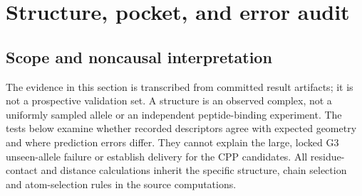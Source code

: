 \clearpage
\section{Structure, pocket, and error audit}
\subsection{Scope and noncausal interpretation}
The evidence in this section is transcribed from committed result artifacts; it is not a prospective validation set. A structure is an observed complex, not a uniformly sampled allele or an independent peptide-binding experiment. The tests below examine whether recorded descriptors agree with expected geometry and where prediction errors differ. They cannot explain the large, locked G3 unseen-allele failure or establish delivery for the CPP candidates. All residue-contact and distance calculations inherit the specific structure, chain selection and atom-selection rules in the source computations.
